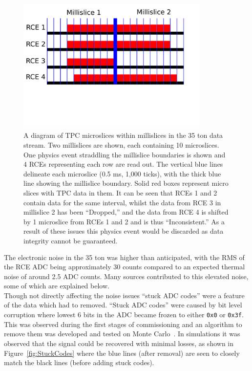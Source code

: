 \begin{figure}[h!]
  \centering
  \includegraphics[width=0.85\textwidth]{DataDrops}
  \caption[Dropped TPC data in the 35 ton]
          {A diagram of TPC microslices within millislices in the 35 ton data stream. Two millislices are shown, each containing 10 microslices. One physics event straddling the millislice boundaries is shown and 4 RCEs representing each row are read out. The vertical blue lines delineate each microslice (0.5 ms, 1,000 ticks), with the thick blue line showing the millislice boundary. Solid red boxes represent micro slices with TPC data in them. It can be seen that RCEs 1 and 2 contain data for the same interval, whilst the data from RCE 3 in millislice 2 has been ``Dropped,'' and the data from RCE 4 is shifted by 1 microslice from RCEs 1 and 2 and is thus ``Inconsistent.'' As a result of these issues this physics event would be discarded as data integrity cannot be guaranteed.}
  \label{fig:DataDrops}
\end{figure}

The electronic noise in the 35 ton was higher than anticipated, with the RMS of the RCE ADC being approximately 30 counts compared to an expected thermal noise of around 2.5 ADC counts. Many sources contributed to this elevated noise, some of which are explained below. \\

Though not directly affecting the noise issues ``stuck ADC codes'' were a feature of the data which had to removed. ``Stuck ADC codes'' were caused by bit level corruption where lowest 6 bits in the ADC became frozen to either {\tt 0x0} or {\tt 0x3f}. This was observed during the first stages of commissioning and an algorithm to remove them was developed and tested on Monte Carlo~\citep{InslerStuckCode}. In simulations it was observed that the signal could be recovered with minimal losses, as shown in Figure~\ref{fig:StuckCodes} where the blue lines (after removal) are seen to closely match the black lines (before adding stuck codes). \\


